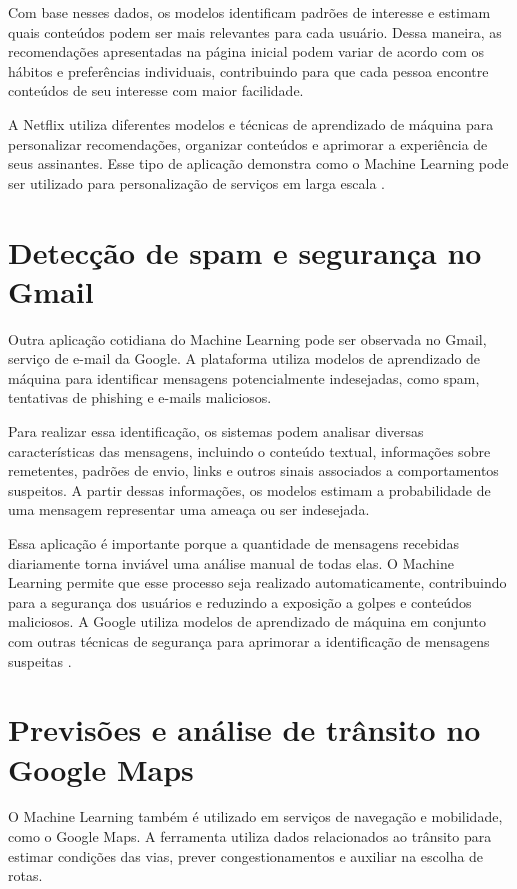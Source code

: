 Com base nesses dados, os modelos identificam padrões de interesse e estimam quais conteúdos podem ser mais relevantes para cada usuário. Dessa maneira, as recomendações apresentadas na página inicial podem variar de acordo com os hábitos e preferências individuais, contribuindo para que cada pessoa encontre conteúdos de seu interesse com maior facilidade.

A Netflix utiliza diferentes modelos e técnicas de aprendizado de máquina para personalizar recomendações, organizar conteúdos e aprimorar a experiência de seus assinantes. Esse tipo de aplicação demonstra como o Machine Learning pode ser utilizado para personalização de serviços em larga escala \cite{netflixResearch, netflixRecommender}.

\section{Detecção de spam e segurança no Gmail}

Outra aplicação cotidiana do Machine Learning pode ser observada no Gmail, serviço de e-mail da Google. A plataforma utiliza modelos de aprendizado de máquina para identificar mensagens potencialmente indesejadas, como spam, tentativas de phishing e e-mails maliciosos.

Para realizar essa identificação, os sistemas podem analisar diversas características das mensagens, incluindo o conteúdo textual, informações sobre remetentes, padrões de envio, links e outros sinais associados a comportamentos suspeitos. A partir dessas informações, os modelos estimam a probabilidade de uma mensagem representar uma ameaça ou ser indesejada.

Essa aplicação é importante porque a quantidade de mensagens recebidas diariamente torna inviável uma análise manual de todas elas. O Machine Learning permite que esse processo seja realizado automaticamente, contribuindo para a segurança dos usuários e reduzindo a exposição a golpes e conteúdos maliciosos. A Google utiliza modelos de aprendizado de máquina em conjunto com outras técnicas de segurança para aprimorar a identificação de mensagens suspeitas \cite{googleGmailML, googleSpamTensorflow}.

\section{Previsões e análise de trânsito no Google Maps}

O Machine Learning também é utilizado em serviços de navegação e mobilidade, como o Google Maps. A ferramenta utiliza dados relacionados ao trânsito para estimar condições das vias, prever congestionamentos e auxiliar na escolha de rotas.

